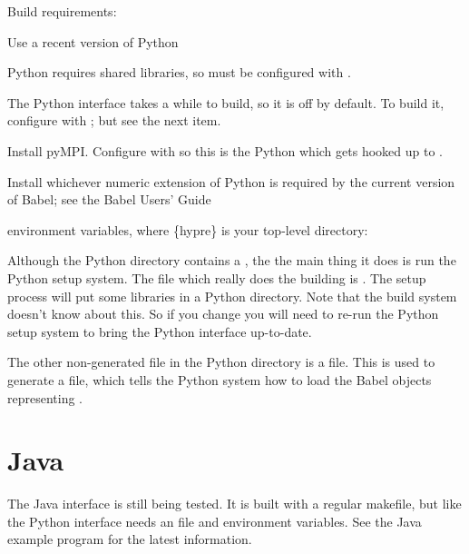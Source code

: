 Build requirements:
\begin{list}{.}{\setlength{\itemsep}{0in}}
\item Use a recent version of Python
\item Python requires shared libraries, so \hypre{} must be configured
with .
\item The Python interface takes a while to build, so it is off by
default.  To build it, configure \hypre{} with ;
but see the next item.
\item Install pyMPI.  Configure \hypre{} with  so
this is the Python which gets hooked up to \hypre{}.
\item Install whichever numeric extension of Python is required by the
current version of Babel; see the Babel Users' Guide
\item environment variables, where \{hypre\} is your top-level \hypre{} directory:
 \newline
 \newline
\end{list}

Although the Python directory contains a , the the main
thing it does is run the Python setup system. The file which really
does the building is . The setup process will put some
\hypre{} libraries in a Python directory.  Note that the \hypre{}
build system doesn't know about this.  So if you change \hypre{} you
will need to re-run the Python setup system to bring the Python
interface up-to-date.

The other non-generated file in the Python directory
 is a  file.  This is used to
generate a  file, which tells the Python system how to load
the Babel objects representing \hypre{}.

\section{Java}

The Java interface is still being tested.  It is built with a regular
makefile, but like the Python interface needs an  file and
environment variables.  See the Java example program  for
the latest information.

